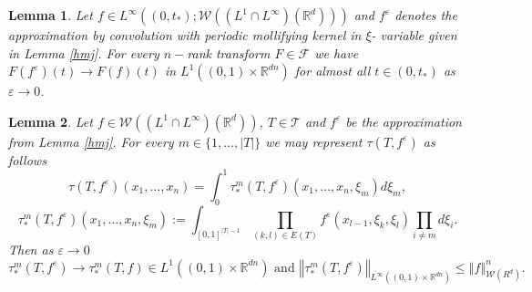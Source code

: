 \documentclass[10pt,a4paper]{amsart}
\newtheorem{lemma}{Lemma}
\newcommand{\R}{\mathbb{R}}
\newcommand{\Tree}{\mathcal{T}}
\newcommand{\W}{\mathcal{W}}
\newcommand{\izj}{\int_{0}^{1}}
\newcommand{\m}[1]{\mbox{#1}}
\newcommand*{\norm}[1]{\left\Vert{#1}\right\Vert}
\newcommand{\ve}{\varepsilon}
\begin{document}
\begin{lemma}\label{apro}
Let $f\in L^\infty((0,t_{*});\W((L^1\cap L^{\infty})(\R^d)))$ and $f^\ve$ denotes the approximation by convolution with periodic mollifying kernel in $\xi$- variable given in Lemma \ref{hmj}. For every $n-$rank transform  $F \in \mathcal{F}$ we have $ F(f^\ve)(t) \rightarrow  F(f)(t)$ in $L^{1}((0,1)\times\R^{dn})$ for almost all $t \in (0,t_{*})$ as $\ve \rightarrow 0$.
\end{lemma}

\begin{lemma}\label{taustar}
Let $f \in \W((L^{1}\cap L^{\infty})(\R^d))$, $T \in \Tree$ and $f^\ve$ be the approximation from Lemma \ref{hmj}. For every $m \in \{1,\dots,|T|\}$ we may represent $\tau(T,f^{\ve})$ as follows
\[
\tau(T,f^{\ve})(x_1,\dots,x_n) = \izj \tau_{*}^m(T,f^{\ve})(x_1,\dots,x_n,\xi_m)d\xi_m,
\]
\[
\tau_{*}^m(T,f^{\ve})(x_1,\dots,x_n,\xi_m):=\int_{[0,1]^{|T|-1}}\prod_{(k,l)\in E(T)}f^{\ve}(x_{l-1},\xi_k,\xi_l) \prod_{i\neq m} d\xi_i.
\]
Then as $\ve \rightarrow 0$
\[
\tau^m_{*}(T,f^{\ve}) \rightarrow \tau_{*}^m(T,f) \in L^{1}((0,1)\times \R^{dn}) \m{ and } \norm{\tau^m_{*}(T,f^\ve)}_{L^{\infty}((0,1)\times \R^{dn})} \leq \norm{f}_{\W(R^d)}^n. 
\]
\end{lemma}
\end{document}

